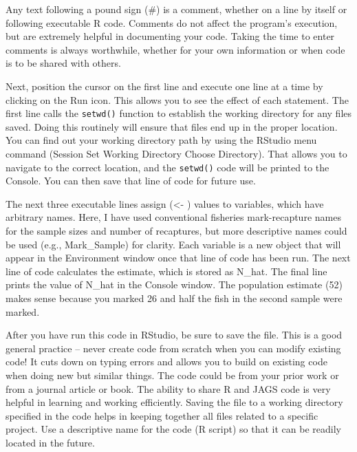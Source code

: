\documentclass[
]{krantz}
\begin{document}
Any text following a pound sign (\#) is a comment, whether on a line by itself or following executable R code. Comments do not affect the program's execution, but are extremely helpful in documenting your code. Taking the time to enter comments is always worthwhile, whether for your own information or when code is to be shared with others.

Next, position the cursor on the first line and execute one line at a time by clicking on the Run icon. This allows you to see the effect of each statement. The first line calls the \texttt{setwd()} function to establish the working directory for any files saved. Doing this routinely will ensure that files end up in the proper location. You can find out your working directory path by using the RStudio menu command (Session \textbar{} Set Working Directory \textbar{} Choose Directory). That allows you to navigate to the correct location, and the \texttt{setwd()} code will be printed to the Console. You can then save that line of code for future use.

The next three executable lines assign (\textless- ) values to variables, which have arbitrary names. Here, I have used conventional fisheries mark-recapture names for the sample sizes and number of recaptures, but more descriptive names could be used (e.g., Mark\_Sample) for clarity. Each variable is a new object that will appear in the Environment window once that line of code has been run. The next line of code calculates the estimate, which is stored as N\_hat. The final line prints the value of N\_hat in the Console window. The population estimate (52) makes sense because you marked 26 and half the fish in the second sample were marked.

After you have run this code in RStudio, be sure to save the file. This is a good general practice -- never create code from scratch when you can modify existing code! It cuts down on typing errors and allows you to build on existing code when doing new but similar things. The code could be from your prior work or from a journal article or book. The ability to share R and JAGS code is very helpful in learning and working efficiently. Saving the file to a working directory specified in the code helps in keeping together all files related to a specific project. Use a descriptive name for the code (R script) so that it can be readily located in the future.
\end{document}

